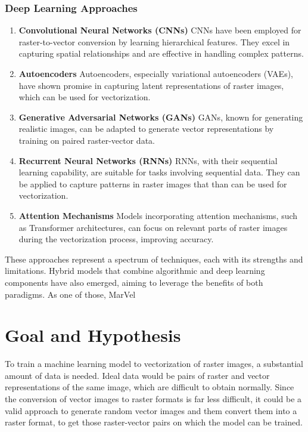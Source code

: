 \documentclass[12pt, a4paper, titlepage]{report}
\begin{document}
\subsection{Deep Learning Approaches}

\begin{enumerate}[label=\Roman*]
   \item \textbf{Convolutional Neural Networks (CNNs)} CNNs have been employed for raster-to-vector conversion by learning hierarchical features. They excel in capturing spatial relationships and are effective in handling complex patterns.

   \item \textbf{Autoencoders} Autoencoders, especially variational autoencoders (VAEs), have shown promise in capturing latent representations of raster images, which can be used for vectorization.

   \item \textbf{Generative Adversarial Networks (GANs)} GANs, known for generating realistic images, can be adapted to generate vector representations by training on paired raster-vector data.

   \item \textbf{Recurrent Neural Networks (RNNs)} RNNs, with their sequential learning capability, are suitable for tasks involving sequential data. They can be applied to capture patterns in raster images that than can be used for vectorization.

   \item \textbf{Attention Mechanisms} Models incorporating attention mechanisms, such as Transformer architectures, can focus on relevant parts of raster images during the vectorization process, improving accuracy.
\end{enumerate}

These approaches represent a spectrum of techniques, each with its strengths and limitations. Hybrid models that combine algorithmic and deep learning components have also emerged, aiming to leverage the benefits of both paradigms. As one of those, MarVel




\chapter{Goal and Hypothesis}

To train a machine learning model to vectorization of raster images, a substantial amount of data is needed. Ideal data would be pairs of raster and vector representations of the same image, which are difficult to obtain normally. Since the conversion of vector images to raster formats is far less difficult, it could be a valid approach to generate random vector images and them convert them into a raster format, to get those raster-vector pairs on which the model can be trained.
\end{document}

